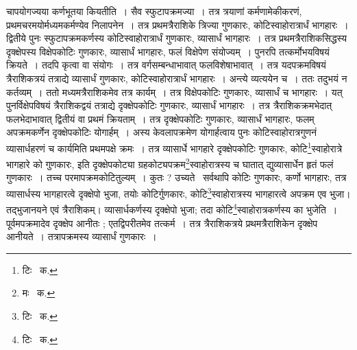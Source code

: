 \documentclass[11pt, openany]{book}
\begin{document}
\noindent चापयोगज्यया कर्णभूतया कियतीति~। सैव स्फुटापक्रमज्या~। तत्र त्रयाणां कर्मणामेकीकरणं, प्रथमचरमयोर्मध्यमकर्मण्येव निलापनेन~। तत्र प्रथमत्रैराशिके त्रिज्या गुणकारः, कोटिस्वाहोरात्रार्धं भागहारः~। द्वितीये पुनः स्फुटापक्रमकर्णस्य कोटिस्वाहोरात्रार्धं गुणकारः, व्यासार्धं भागहारः~। तत्र प्रथमत्रैराशिकसिद्धस्य दृक्क्षेपस्य विक्षेपकोटिः गुणकारः, व्यासार्धं भागहारः, फलं विक्षेपेण संयोज्यम्~। पुनरपि तत्कर्मोभयविषयं क्रियते~। तदपि कृत्वा वा संयोगः~। तत्र वर्गसम्बन्धाभावात् फलविशेषाभावात्~। तत्र यदपक्रमविषयं त्रैराशिकत्रयं तत्राद्ये व्यासार्धं गुणकारः, कोटिस्वाहोरात्रार्धं भागहारः~। अन्त्ये व्यत्ययेन च~। ततः तदुभयं न कर्तव्यम्~। ततो मध्यमत्रैराशिकमेव तत्र कार्यम्~। तत्र विक्षेपकोटिः गुणकारः, व्यासार्धं च भागहारः~। यत् पुनर्विक्षेपविषयं त्रैराशिकद्वयं तत्राद्ये दृक्क्षेपकोटिः गुणकारः, व्यासार्धं भागहारः~।
तत्र त्रैराशिकक्रमभेदात् फलभेदाभावात् द्वितीयं वा प्रथमं क्रियताम्~। तत्र दृक्क्षेपकोटिः गुणकारः, व्यासार्धं भागहारः, फलम् अपक्रमकर्णेन
दृक्क्षेपकोटिः योगार्हम्~। अस्य केवलापक्रमेण योगार्हत्वाय पुनः कोटिस्वाहोरात्रगुणनं व्यासार्धहरणं च कार्यमिति प्रथमपक्षे क्रमः~। तत्र
व्यासार्धे भागहारे दृक्क्षेपकोटिः गुणकारः, कोटि\renewcommand{\thefootnote}{१}\footnote{टिः \textendash\ क.}स्वाहोरात्रे भागहारे को गुणकारः, इति दृक्क्षेपकोट्या ग्रहकोट्यपक्रम\renewcommand{\thefootnote}{२}\footnote{मः \textendash\ क.}स्वाहोरात्रस्य च घातात् द्युव्यासार्धेन हृतं फलं गुणकारः~। तच्च परमापक्रमकोटितुल्यम्~। कुतः ? उच्यते \textendash\ सर्वथापि कोटिः गुणकारः, कर्णो भागहारः, तत्र व्यासार्धस्य भागहारत्वे दृक्क्षेपो भुजा, तयोः कोटिर्गुणकारः, कोटि\renewcommand{\thefootnote}{३}\footnote{टिः \textendash\ क.}स्वाहोरात्रस्य भागहारत्वे अपक्रम एव भुजा। तद्भुजानयने एवं त्रैराशिकम्। व्यासार्धकर्णस्य दृक्क्षेपो भुजा; तदा कोटि\renewcommand{\thefootnote}{४}\footnote{टिः \textendash\ क.}स्वाहोरात्रकर्णस्य का भुजेति~। पूर्वमपक्रमादेव दृक्क्षेप आनीतः ; एतद्विपरीतमेव तत्कर्म~। तत्र त्रैराशिकत्रये प्रथमत्रैराशिकेन दृक्क्षेप आनीयते~। तत्रापक्रमस्य व्यासार्धं गुणकारः~।

\newpage
\end{document}
